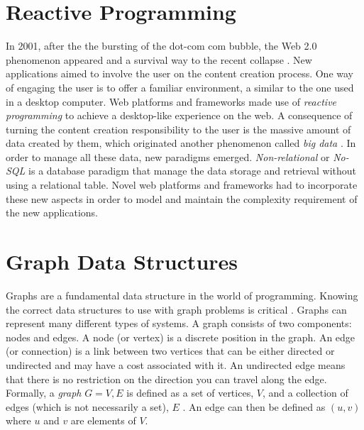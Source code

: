 


\section{Reactive Programming}

In 2001, after the the bursting of the dot-com com bubble, the Web 2.0 phenomenon appeared and a survival way to the recent collapse \cite{oreilly2005}.
New applications aimed to involve the user on the content creation process.
One way of engaging the user is to offer a familiar environment, a similar to the one used in a desktop computer.
Web platforms and frameworks made use of \emph{reactive programming} \cite{reactive2014} to achieve a desktop-like experience on the web.
A consequence of turning the content creation responsibility to the user is the massive amount of data created by them, which originated another phenomenon called \emph{big data} \cite{SharmaTWGS14}.
In order to manage all these data, new paradigms emerged.
\emph{Non-relational} or \emph{No-SQL} \cite{Strauch12} is a database paradigm that manage the data storage and retrieval without using a relational table.
Novel web platforms and frameworks had to incorporate these new aspects in order to model and maintain the complexity requirement of the new applications.

\section{Graph Data Structures}


Graphs are a fundamental data structure in the world of programming.
Knowing the correct data structures to use with graph problems is critical \cite{topcoder}.
Graphs can represent many different types of systems.
A graph consists of two components: nodes and edges. 
A node (or vertex) is a discrete position in the graph. 
An edge (or connection) is a link between two vertices that can be either directed or undirected and may have a cost associated with it. 
An undirected edge means that there is no restriction on the direction you can travel along the edge. 
Formally, a \emph{graph} $G = {V, E}$ is defined as a set of vertices, $V$, and a collection of edges (which is not necessarily a set), $E$ \cite{berge1973graphs}.
An edge can then be defined as $(u, v)$ where $u$ and $v$ are elements of $V$.
%

